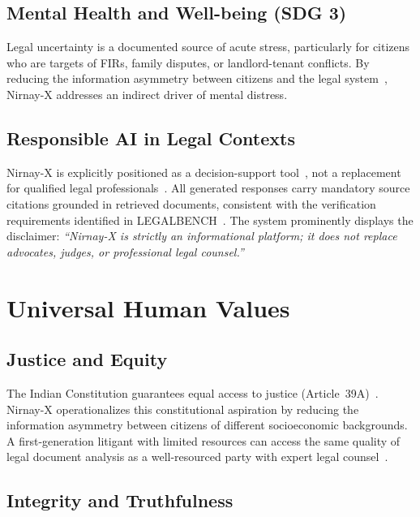 \documentclass[12pt,a4paper]{article}
\begin{document}
\subsection{Mental Health and Well-being (SDG 3)}

Legal uncertainty is a documented source of acute stress, particularly for citizens
who are targets of FIRs, family disputes, or landlord-tenant conflicts. By reducing
the information asymmetry between citizens and the legal system~\cite{const_india,
ashley2017ai}, Nirnay-X addresses an indirect driver of mental distress.

\subsection{Responsible AI in Legal Contexts}

Nirnay-X is explicitly positioned as a decision-support tool~\cite{ashley2017ai},
not a replacement for qualified legal professionals~\cite{mlaw}. All generated
responses carry mandatory source citations grounded in retrieved documents, consistent
with the verification requirements identified in LEGALBENCH~\cite{guha2023legalbench}.
The system prominently displays the disclaimer: \textit{``Nirnay-X is strictly an
informational platform; it does not replace advocates, judges, or professional legal
counsel.''}

\section{Universal Human Values}

\subsection{Justice and Equity}

The Indian Constitution guarantees equal access to justice (Article~39A)~\cite{const_india}.
Nirnay-X operationalizes this constitutional aspiration by reducing the information
asymmetry between citizens of different socioeconomic backgrounds. A first-generation
litigant with limited resources can access the same quality of legal document analysis
as a well-resourced party with expert legal counsel~\cite{ashley2017ai}.

\subsection{Integrity and Truthfulness}
\end{document}
